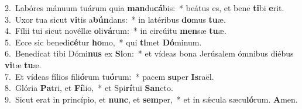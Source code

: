 {2.~}Labóres mánuum tuárum quia \textbf{man}du\textbf{cá}bis:~* beátus es, et bene \textbf{ti}bi \textbf{e}rit.\\
{3.~}Uxor tua sicut \textbf{vi}tis a\textbf{bún}dans:~* in latéribus \textbf{do}mus \textbf{tu}æ.\\
{4.~}Fílii tui sicut novéllæ \textbf{o}li\textbf{vá}rum:~* in circúitu \textbf{men}sæ \textbf{tu}æ.\\
{5.~}Ecce sic benedi\textbf{cé}tur \textbf{ho}mo,~* qui \textbf{ti}met \textbf{Dó}minum.\\
{6.~}Benedícat tibi Dómi\textbf{nus} ex \textbf{Si}on:~* et vídeas bona Jerúsalem ómnibus diébus \textbf{vi}tæ \textbf{tu}æ.\\
{7.~}Et vídeas fílios fili\textbf{ó}rum tu\textbf{ó}rum:~* pacem \textbf{su}per \textbf{Is}raël.\\
{8.~}Glória \textbf{Pa}tri, et \textbf{Fí}lio,~* et Spi\textbf{rí}tui \textbf{San}cto.\\
{9.~}Sicut erat in princípio, et \textbf{nunc}, et \textbf{sem}per,~* et in sǽcula sæcu\textbf{ló}rum. \textbf{A}men.\\
